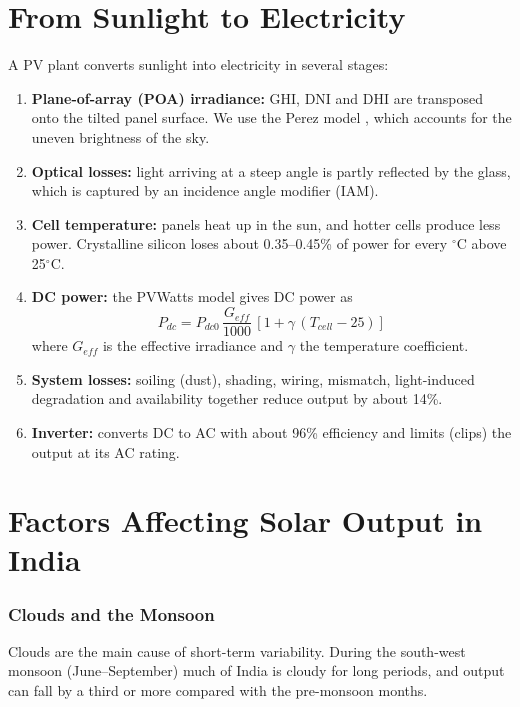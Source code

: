 \documentclass[12pt]{report}
\begin{document}
\section{From Sunlight to Electricity}
\vspace{1mm}
A PV plant converts sunlight into electricity in several stages:
\begin{enumerate}[noitemsep]
    \item \textbf{Plane-of-array (POA) irradiance:} GHI, DNI and DHI are transposed onto the tilted panel surface. We use the Perez model \cite{perez1990}, which accounts for the uneven brightness of the sky.
    \item \textbf{Optical losses:} light arriving at a steep angle is partly reflected by the glass, which is captured by an incidence angle modifier (IAM).
    \item \textbf{Cell temperature:} panels heat up in the sun, and hotter cells produce less power. Crystalline silicon loses about 0.35--0.45\% of power for every $^\circ$C above 25$^\circ$C.
    \item \textbf{DC power:} the PVWatts model \cite{pvwatts} gives DC power as
    \begin{equation}
        P_{dc} = P_{dc0}\,\frac{G_{eff}}{1000}\,\left[1 + \gamma\,(T_{cell} - 25)\right]
    \end{equation}
    where $G_{eff}$ is the effective irradiance and $\gamma$ the temperature coefficient.
    \item \textbf{System losses:} soiling (dust), shading, wiring, mismatch, light-induced degradation and availability together reduce output by about 14\%.
    \item \textbf{Inverter:} converts DC to AC with about 96\% efficiency and limits (clips) the output at its AC rating.
\end{enumerate}

\section{Factors Affecting Solar Output in India}
\vspace{1mm}
\subsubsection{Clouds and the Monsoon}
Clouds are the main cause of short-term variability. During the south-west monsoon (June--September) much of India is cloudy for long periods, and output can fall by a third or more compared with the pre-monsoon months.
\end{document}
